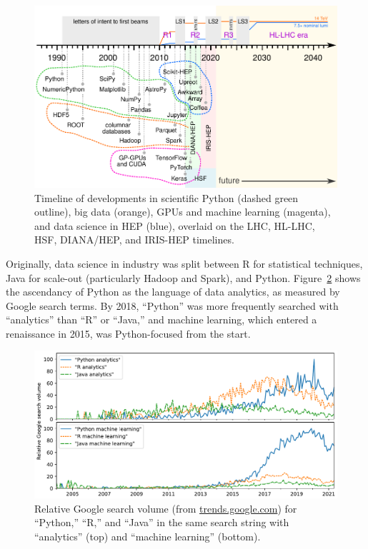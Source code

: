\documentclass{article}
\begin{document}
\begin{figure}
\centering
\includegraphics[width=0.8\linewidth]{fig/hllhc-python-timeline-paper.pdf}

\caption{Timeline of developments in scientific Python (dashed green outline), big data (orange), GPUs and machine learning (magenta), and data science in HEP (blue), overlaid on the LHC, HL-LHC, HSF, DIANA/HEP, and IRIS-HEP timelines. \label{fig:hllhc-python-timeline-paper}}
\end{figure}

Originally, data science in industry was split between R for statistical techniques, Java for scale-out (particularly Hadoop and Spark), and Python. Figure~\ref{fig:analytics-by-language} shows the ascendancy of Python as the language of data analytics, as measured by Google search terms. By 2018, ``Python'' was more frequently searched with ``analytics'' than ``R'' or ``Java,'' and machine learning, which entered a renaissance in 2015, was Python-focused from the start.

\begin{figure}
\centering
\includegraphics[width=0.8\linewidth]{fig/analytics-by-language.pdf}

\caption{Relative Google search volume (from \href{https://trends.google.com/}{trends.google.com}) for ``Python,'' ``R,'' and ``Java'' in the same search string with ``analytics'' (top) and ``machine learning'' (bottom). \label{fig:analytics-by-language}}
\end{figure}
\end{document}

